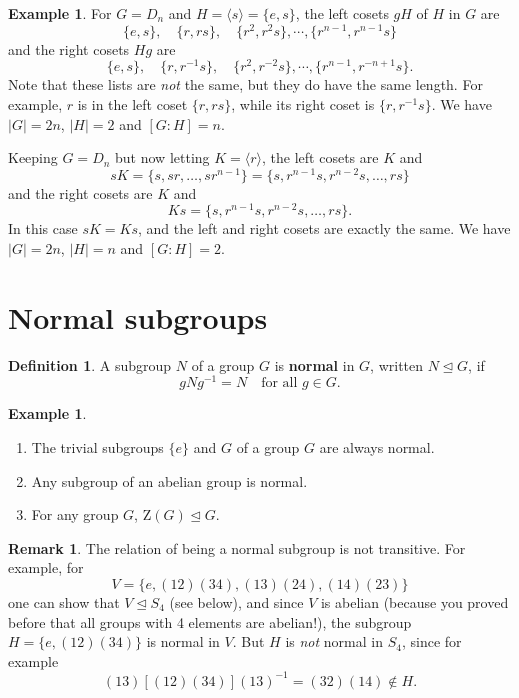 \documentclass[12pt]{report}
\numberwithin{equation}{section}
\numberwithin{theorem}{chapter}
\theoremstyle{definition}
\newtheorem{definition}[theorem]{Definition}
\newtheorem{example}[theorem]{Example}
\newtheorem*{basic properties}{Basic Properties}
\newtheorem*{Important Remark}{Important Remark}
\newtheorem{remark}[theorem]{Remark}
\begin{document}
\begin{example}\label{example cosets D_n}
For $G =D_{n}$ and $H = \langle s \rangle = \{e,s\}$, the left cosets $gH$ of $H$ in $G$ are 
$$
\{e, s\}, \quad  \{r, rs\}, \quad  \{r^2, r^2s\}, \cdots , \{r^{n-1}, r^{n-1}s\}
$$
and the right cosets $Hg$ are
$$
\{e, s\}, \quad \{r, r^{-1}s\}, \quad \{r^2, r^{-2}s\}, \cdots , \{r^{n-1}, r^{-n+1}s\}.
$$
Note that these lists are {\em not} the same, but they do have the same length. For example, $r$ is in the left coset $\{ r, rs \}$, while its right coset is $\{ r, r^{-1}s \}$. 
We have $|G| = 2n$, $|H| = 2$ and $[G:H] = n$.

Keeping $G = D_{n}$ but now letting $K = \langle r \rangle$, the left cosets are $K$ and 
$$
sK = \{s, sr, \dots, sr^{n-1} \} =\{s, r^{n-1}s, r^{n-2}s,\dots, rs \}
$$
and the right cosets are $K$ and 
$$
Ks = \{s, r^{n-1}s, r^{n-2}s,\dots, rs \}.
$$
In this case $sK = Ks$, and the left and right cosets are exactly the same. We have $|G| = 2n$, $|H| = n$ and $[G:H] = 2$.
\end{example}



\section{Normal subgroups}

\begin{definition}
A subgroup $N$ of a group $G$ is {\bf normal} in $G$, written $N\trianglelefteq G$, if $$gNg^{-1} = N \quad \textrm{for all } g \in G.$$
\end{definition}



\begin{example}$\,$
\begin{enumerate}
\item The trivial subgroups $\{e\}$ and $G$ of a group $G$ are always normal.
\item Any subgroup of an abelian group is normal.
\item For any group $G$, $\mathrm{Z}(G)\trianglelefteq G$.
\end{enumerate}
\end{example}



\begin{remark}
The relation of being a normal subgroup is not transitive. For example, for 
$$V=\{e, (1 2)(3 4), (1 3)(2 4), (1 4)(2 3)\}$$ 
one can show that $V \trianglelefteq S_4$ (see  below), and since $V$ is abelian (because you proved before that all groups with 4 elements are abelian!), the subgroup $H = \{e,(12)(34)\}$ is normal in $V$. But $H$ is {\em not} normal in $S_4$, since for example
$$(1 3) [(1 2)(3 4)] (1 3)^{-1} = (3 2)(1 4) \notin H.$$
\end{remark}
\end{document}

